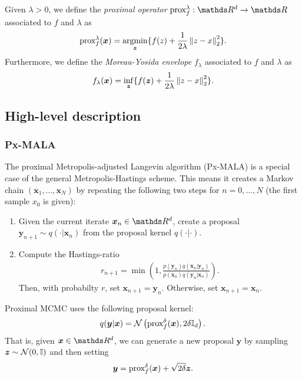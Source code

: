 \documentclass[10pt]{article}
\numberwithin{equation}{section}
\begin{document}
Given $\lambda > 0$, we define the \emph{proximal operator} $\prox{f}{\lambda}: \R^d \to \R$ associated to $f$ and $\lambda$ as
\begin{align*}
\text{prox}_{f}^{\lambda}(\bm x) = \operatorname*{argmin}_{\bm z} \lbrace f(z) + \frac{1}{2 \lambda} \left\|z - x\right\|_2^2 \rbrace.
\end{align*}
Furthermore, we define the \emph{Moreau-Yosida envelope} $f_\lambda$ associated to $f$ and $\lambda$ as
\begin{align*}
f_\lambda(\bm x) = \inf_{\bm z}  \lbrace f(\bm z) + \frac{1}{2 \lambda} \left\|z - x\right\|_2^2 \rbrace.
\end{align*}

\subsection{High-level description}

\subsubsection{Px-MALA}

The proximal Metropolis-adjusted Langevin algorithm (Px-MALA) is a special case of the general Metropolis-Hastings scheme. This means it creates a Markov chain $(\bm x_1, \ldots, \bm x_N)$ by repeating the following two steps for $n=0,\ldots, N$ (the first sample $x_0$ is given):
\begin{enumerate}
\item Given the current iterate $\bm x_n \in \R^d$, create a proposal $\bm y_{n+1} \sim q(\cdot | \bm x_n)$ from the proposal kernel $q(\cdot | \cdot)$.
\item Compute the Hastings-ratio
\begin{align*}
r_{n+1} = \min \left(1, \frac{p(\bm y_n) q(\bm x_n| \bm y_n)}{p(\bm x_n) q(\bm y_n| \bm x_n)} \right).
\end{align*}
Then, with probabilty $r$, set $\bm x_{n+1} = \bm y_n$. Otherwise, set $\bm x_{n+1} = \bm x_n$.
\end{enumerate}

Proximal MCMC uses the following proposal kernel:
\begin{align*}
q(\bm y | \bm x) =  \mathcal{N}\left( \text{prox}_{f}^{\delta}(\bm x), 2 \delta \mathbb{I}_d \right).
\end{align*}
That is, given $\bm x \in \R^d$, we can generate a new proposal $\bm y$ by sampling $\bm z \sim \mathcal{N}(0, \mathbb{I})$ and then setting
\begin{align*}
\bm y = \text{prox}_{f}^{\delta}(\bm x) + \sqrt{2 \delta} \bm z.
\end{align*}
\end{document}
